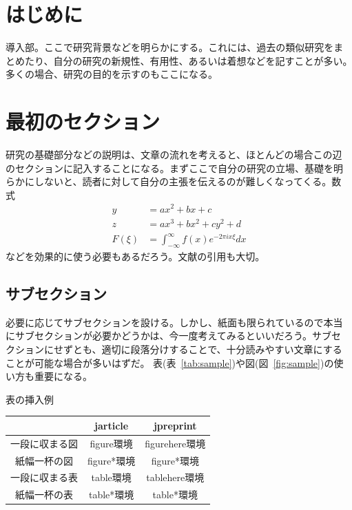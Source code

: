 \documentclass{jabstract}
\begin{document}
\maketitle

\begin{multicols}{2}
  
\section{はじめに}
導入部。ここで研究背景などを明らかにする。これには、過去の類似研究をま
とめたり、自分の研究の新規性、有用性、あるいは着想などを記すことが多い。
多くの場合、研究の目的を示すのもここになる。

\section{最初のセクション}
研究の基礎部分などの説明は、文章の流れを考えると、ほとんどの場合この辺
のセクションに記入することになる。まずここで自分の研究の立場、基礎を明
らかにしないと、読者に対して自分の主張を伝えるのが難しくなってくる。数
式
\begin{align*}
  y &= ax^2 + bx + c\\
  z &= ax^3 + bx^2 + cy^2 + d\\
  F(\xi) &= \int^{\infty}_{-\infty}f(x)e^{-2\pi ix\xi}dx
\end{align*}
などを効果的に使う必要もあるだろう。文献の引用\cite{refinfo}も大切。

\subsection{サブセクション}
必要に応じてサブセクションを設ける。しかし、紙面も限られているので本当
にサブセクションが必要かどうかは、今一度考えてみるといいだろう。サブセ
クションにせずとも、適切に段落分けすることで、十分読みやすい文章にする
ことが可能な場合が多いはずだ。
表(表~\ref{tab:sample})や図(図~\ref{fig:sample})の使い方も重要になる。

\begin{tablehere}
  \noindent
  \parbox{\linewidth}{
    \centering
    \caption{表の挿入例}\label{tab:sample}
    \begin{tabular}{|c|c|c|}
      \hline
      & jarticle & jpreprint\\
      \hline
      一段に収まる図 & figure環境 & figurehere環境\\
      \hline
      紙幅一杯の図 & figure*環境 & figure*環境\\
      \hline
      一段に収まる表 & table環境 & tablehere環境\\
      \hline
      紙幅一杯の表 & table*環境 & table*環境\\
      \hline
    \end{tabular}
  }%
\end{tablehere}


\end{multicols}
\end{document}
